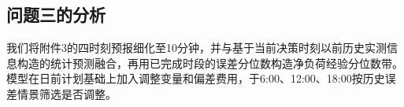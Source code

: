 \subsection{问题三的分析}

我们将附件3的四时刻预报细化至10分钟，并与基于当前决策时刻以前历史实测信息构造的统计预测融合，再用已完成时段的误差分位数构造净负荷经验分位数带。模型在日前计划基础上加入调整变量和偏差费用，于6:00、12:00、18:00按历史误差情景筛选是否调整。

